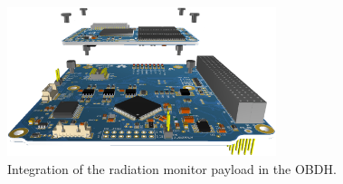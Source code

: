 \begin{figure}[!ht]
    \begin{center}
        \includegraphics[width=0.7\textwidth]{figures/daughterboard-integration}
        \caption{Integration of the radiation monitor payload in the OBDH.}
        \label{fig:harsh-payload-integration}
    \end{center}
\end{figure}
